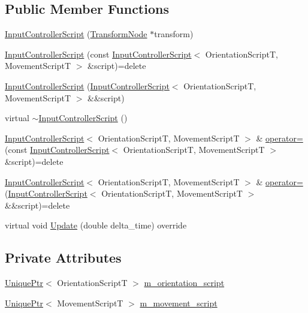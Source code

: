 \subsection*{Public Member Functions}
\begin{DoxyCompactItemize}
\item 
\hyperlink{classmage_1_1_input_controller_script_adf1edb71170cb5184f201a64ad7455cb}{Input\+Controller\+Script} (\hyperlink{structmage_1_1_transform_node}{Transform\+Node} $\ast$transform)
\item 
\hyperlink{classmage_1_1_input_controller_script_a22de786b39180e18b8565b211797388d}{Input\+Controller\+Script} (const \hyperlink{classmage_1_1_input_controller_script}{Input\+Controller\+Script}$<$ Orientation\+ScriptT, Movement\+ScriptT $>$ \&script)=delete
\item 
\hyperlink{classmage_1_1_input_controller_script_a18b905c7a204c22173dcaf19a9587f7d}{Input\+Controller\+Script} (\hyperlink{classmage_1_1_input_controller_script}{Input\+Controller\+Script}$<$ Orientation\+ScriptT, Movement\+ScriptT $>$ \&\&script)
\item 
virtual \hyperlink{classmage_1_1_input_controller_script_ac5699d9a4d9a3f9c456885a92dede979}{$\sim$\+Input\+Controller\+Script} ()
\item 
\hyperlink{classmage_1_1_input_controller_script}{Input\+Controller\+Script}$<$ Orientation\+ScriptT, Movement\+ScriptT $>$ \& \hyperlink{classmage_1_1_input_controller_script_a747a0a1cb4064a5b8580195c0a53b887}{operator=} (const \hyperlink{classmage_1_1_input_controller_script}{Input\+Controller\+Script}$<$ Orientation\+ScriptT, Movement\+ScriptT $>$ \&script)=delete
\item 
\hyperlink{classmage_1_1_input_controller_script}{Input\+Controller\+Script}$<$ Orientation\+ScriptT, Movement\+ScriptT $>$ \& \hyperlink{classmage_1_1_input_controller_script_a2e2231433ec17577ce019348285eaba3}{operator=} (\hyperlink{classmage_1_1_input_controller_script}{Input\+Controller\+Script}$<$ Orientation\+ScriptT, Movement\+ScriptT $>$ \&\&script)=delete
\item 
virtual void \hyperlink{classmage_1_1_input_controller_script_a2b91f7c131dee5d09ac38e2878a715e3}{Update} (double delta\+\_\+time) override
\end{DoxyCompactItemize}
\subsection*{Private Attributes}
\begin{DoxyCompactItemize}
\item 
\hyperlink{namespacemage_a3316d7143a973e37adf1110f2e80ca31}{Unique\+Ptr}$<$ Orientation\+ScriptT $>$ \hyperlink{classmage_1_1_input_controller_script_ab5af05a3bf7cdd672382dd5bcb1d6d02}{m\+\_\+orientation\+\_\+script}
\item 
\hyperlink{namespacemage_a3316d7143a973e37adf1110f2e80ca31}{Unique\+Ptr}$<$ Movement\+ScriptT $>$ \hyperlink{classmage_1_1_input_controller_script_aea0478602dbabf616dd3ef8b4408a42a}{m\+\_\+movement\+\_\+script}
\end{DoxyCompactItemize}
